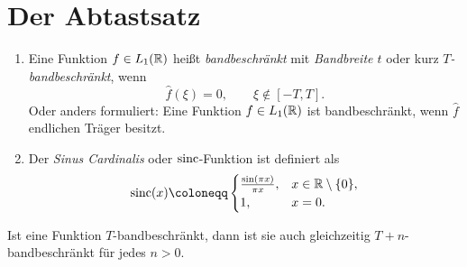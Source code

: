 \section{Der Abtastsatz}

\begin{definition}\leavevmode
\begin{enumerate}
\item Eine Funktion $ f \in L_{1}(\mathbb{R}) $ heißt \emph{bandbeschränkt} mit \emph{Bandbreite $ t $} oder
  kurz \emph{$ T $-bandbeschränkt}, wenn
  \[
    \widehat{f}(\xi) = 0, \qquad \xi \notin [-T,T].
  \]
  Oder anders formuliert: Eine Funktion $ f \in L_{1}(\mathbb{R}) $ ist bandbeschränkt, wenn $ \widehat{f} $
  endlichen Träger besitzt.
\item Der \emph{Sinus Cardinalis} oder $ \operatorname{sinc} $-Funktion ist definiert als
  \[
    \sinc(x) \coloneqq \begin{cases}
      \frac{\sin(\pi x)}{\pi x}, & x \in \R \setminus \{ 0 \}, \\
      1, & x = 0.
    \end{cases}
  \]
\end{enumerate}
\end{definition}

\begin{remark}[Bandbeschränktheit]
Ist eine Funktion $ T $-bandbeschränkt, dann ist sie auch gleichzeitig $ T + n $-bandbeschränkt für
jedes $ n > 0 $.
\end{remark}

